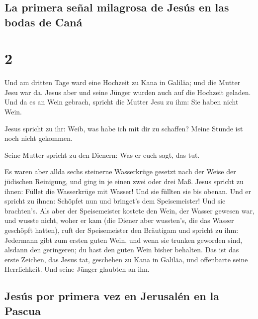 \hypertarget{la-primera-seuxf1al-milagrosa-de-jesuxfas-en-las-bodas-de-canuxe1}{%
\subsection{La primera señal milagrosa de Jesús en las bodas de
Caná}\label{la-primera-seuxf1al-milagrosa-de-jesuxfas-en-las-bodas-de-canuxe1}}

\hypertarget{section-1}{%
\section{2}\label{section-1}}

 Und am dritten Tage ward eine Hochzeit zu Kana in
Galiläa; und die Mutter Jesu war da.  Jesus aber und seine
Jünger wurden auch auf die Hochzeit geladen.  Und da es an
Wein gebrach, spricht die Mutter Jesu zu ihm: Sie haben nicht Wein.

 Jesus spricht zu ihr: Weib, was habe ich mit dir zu
schaffen? Meine Stunde ist noch nicht gekommen.

 Seine Mutter spricht zu den Dienern: Was er euch sagt,
das tut.

 Es waren aber allda sechs steinerne Wasserkrüge gesetzt
nach der Weise der jüdischen Reinigung, und ging in je einen zwei oder
drei Maß.  Jesus spricht zu ihnen: Füllet die Wasserkrüge
mit Wasser! Und sie füllten sie bis obenan.  Und er
spricht zu ihnen: Schöpfet nun und bringet's dem Speisemeister! Und sie
brachten's.  Als aber der Speisemeister kostete den Wein,
der Wasser gewesen war, und wusste nicht, woher er kam (die Diener aber
wussten's, die das Wasser geschöpft hatten), ruft der Speisemeister den
Bräutigam  und spricht zu ihm: Jedermann gibt zum ersten
guten Wein, und wenn sie trunken geworden sind, alsdann den geringeren;
du hast den guten Wein bisher behalten.  Das ist das
erste Zeichen, das Jesus tat, geschehen zu Kana in Galiläa, und
offenbarte seine Herrlichkeit. Und seine Jünger glaubten an ihn.

\hypertarget{jesuxfas-por-primera-vez-en-jerusaluxe9n-en-la-pascua}{%
\subsection{Jesús por primera vez en Jerusalén en la
Pascua}\label{jesuxfas-por-primera-vez-en-jerusaluxe9n-en-la-pascua}}

